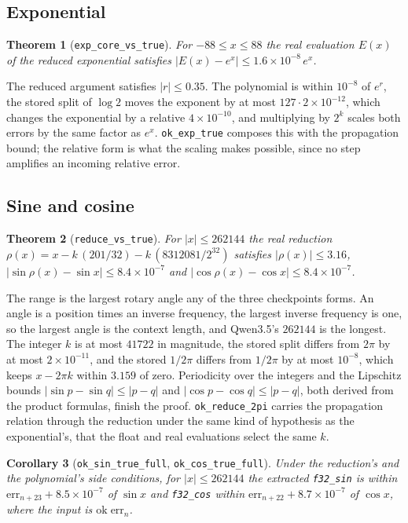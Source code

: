 \documentclass[11pt]{article}
\theoremstyle{plain}
\newtheorem{theorem}{Theorem}[section]
\newtheorem{corollary}[theorem]{Corollary}
\theoremstyle{definition}
\newcommand{\code}[1]{\texttt{#1}}
\begin{document}
\subsection{Exponential}

\begin{theorem}[\code{exp\_core\_vs\_true}]
For $-88 \le x \le 88$ the real evaluation $E(x)$ of the reduced exponential
satisfies $|E(x) - e^x| \le 1.6\times10^{-8}\, e^x$.
\end{theorem}

The reduced argument satisfies $|r| \le 0.35$. The polynomial is within
$10^{-8}$ of $e^r$, the stored split of $\log 2$ moves the exponent by at most
$127 \cdot 2\times10^{-12}$, which changes the exponential by a relative
$4\times10^{-10}$, and multiplying by $2^k$ scales both errors by the same
factor as $e^x$. \code{ok\_exp\_true} composes this with the propagation bound;
the relative form is what the scaling makes possible, since no step amplifies
an incoming relative error.

\subsection{Sine and cosine}

\begin{theorem}[\code{reduce\_vs\_true}]
For $|x| \le 262144$ the real reduction $\rho(x) = x - k\,(201/32) - k\,(8312081/2^{32})$
satisfies $|\rho(x)| \le 3.16$, $|\sin\rho(x) - \sin x| \le 8.4\times10^{-7}$ and
$|\cos\rho(x) - \cos x| \le 8.4\times10^{-7}$.
\end{theorem}

The range is the largest rotary angle any of the three checkpoints forms. An
angle is a position times an inverse frequency, the largest inverse frequency
is one, so the largest angle is the context length, and Qwen3.5's $262144$ is
the longest. The integer $k$ is at most $41722$ in magnitude, the stored split
differs from $2\pi$ by at most $2\times10^{-11}$, and the stored $1/2\pi$
differs from $1/2\pi$ by at most $10^{-8}$, which keeps $x - 2\pi k$ within
$3.159$ of zero.
Periodicity over the integers and the Lipschitz bounds
$|\sin p - \sin q| \le |p - q|$ and $|\cos p - \cos q| \le |p - q|$, both derived
from the product formulas, finish the proof. \code{ok\_reduce\_2pi} carries the
propagation relation through the reduction under the same kind of hypothesis
as the exponential's, that the float and real evaluations select the same $k$.

\begin{corollary}[\code{ok\_sin\_true\_full}, \code{ok\_cos\_true\_full}]
Under the reduction's and the polynomial's side conditions, for
$|x| \le 262144$ the extracted \code{f32\_sin} is within
$\mathrm{err}_{n+23} + 8.5\times10^{-7}$ of $\sin x$ and \code{f32\_cos} within
$\mathrm{err}_{n+22} + 8.7\times10^{-7}$ of $\cos x$, where the input is
$\mathrm{ok}\;\mathrm{err}_n$.
\end{corollary}
\end{document}
